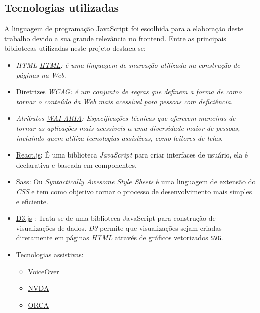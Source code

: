 \subsection{Tecnologias utilizadas} 
{A linguagem de programação JavaScript foi escolhida para a elaboração deste trabalho devido a sua grande relevância no frontend. Entre as principais bibliotecas utilizadas neste projeto destaca-se:
\begin{itemize}
\item \textit{HTML \href{https://developer.mozilla.org/pt-BR/docs/Web/HTML}{HTML}: é uma linguagem de marcação utilizada na construção de páginas na \textit{Web}}.
\item Diretrizes \textit{\href{https://www.w3c.br/traducoes/wcag/wcag21-pt-BR/}{WCAG}: é um conjunto de regras que definem a forma de como tornar o conteúdo da \textit{Web} mais acessível para pessoas com deficiência}.
\item \textit{Atributos \href{https://www.w3.org/TR/wai-aria-1.2/}{WAI-ARIA}: Especificações técnicas que oferecem maneiras de tornar as aplicações mais acessíveis a uma diversidade maior de pessoas, incluindo quem utiliza tecnologias assistivas, como leitores de telas}.
\item { \href{https://pt-br.reactjs.org/}{React.js}: É uma biblioteca \textit{JavaScript} para criar interfaces de usuário, ela é declarativa e baseada em componentes}.
\item {\href{https://sass-lang.com/}{Sass}: Ou \textit{Syntactically Awesome Style Sheets} é uma linguagem de extensão do \textit{CSS} e tem como objetivo tornar o processo de desenvolvimento mais simples e eficiente}.
\item {\href{https://d3js.org/}{D3.js} : Trata-se de uma biblioteca {JavaScript} para construção de visualizações de dados. \textit{D3} permite que visualizações sejam criadas diretamente em páginas \textit{HTML} através de gráficos vetorizados \lstinline{SVG}}.
\item Tecnologias assistivas:
\begin{itemize}
\item \href{https://www.apple.com/br/accessibility/vision/}{VoiceOver}
\item \href{https://www.nvaccess.org/download/}{NVDA}
\item \href{https://help.gnome.org/users/orca/stable/index.html.pt_BR}{ORCA}
\end{itemize}
\end{itemize}
 }
